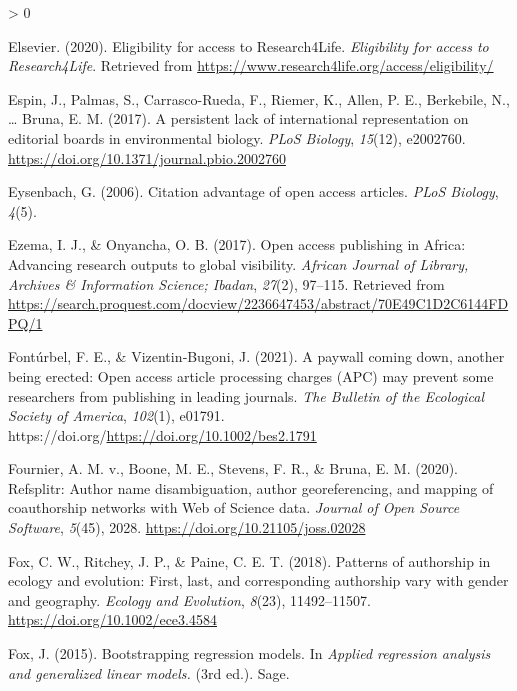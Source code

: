 \documentclass[
  english,
  man]{apa6}
\newlength{\cslhangindent}
\newenvironment{CSLReferences}[2] %
 {%
  \setlength{\parindent}{0pt}
  \ifodd #1 \everypar{\setlength{\hangindent}{\cslhangindent}}\ignorespaces\fi
  \ifnum #2 > 0
  \setlength{\parskip}{#2\baselineskip}
  \fi
 }%
 {}
\begin{document}
\begin{CSLReferences}{1}{0}
\leavevmode\hypertarget{ref-elsevier_eligibility_2020}{}%
Elsevier. (2020). Eligibility for access to {Research4Life}. \emph{Eligibility for access to Research4Life}. Retrieved from \url{https://www.research4life.org/access/eligibility/}

\leavevmode\hypertarget{ref-espin_persistent_2017}{}%
Espin, J., Palmas, S., Carrasco-Rueda, F., Riemer, K., Allen, P. E., Berkebile, N., \ldots{} Bruna, E. M. (2017). A persistent lack of international representation on editorial boards in environmental biology. \emph{PLoS Biology}, \emph{15}(12), e2002760. \url{https://doi.org/10.1371/journal.pbio.2002760}

\leavevmode\hypertarget{ref-eysenbach_citation_2006}{}%
Eysenbach, G. (2006). Citation advantage of open access articles. \emph{PLoS Biology}, \emph{4}(5).

\leavevmode\hypertarget{ref-ezema_open_2017}{}%
Ezema, I. J., \& Onyancha, O. B. (2017). Open access publishing in {Africa}: Advancing research outputs to global visibility. \emph{African Journal of Library, Archives \& Information Science; Ibadan}, \emph{27}(2), 97--115. Retrieved from \url{https://search.proquest.com/docview/2236647453/abstract/70E49C1D2C6144FDPQ/1}

\leavevmode\hypertarget{ref-fonturbel_paywall_2021}{}%
Fontúrbel, F. E., \& Vizentin‐Bugoni, J. (2021). A paywall coming down, another being erected: Open access article processing charges ({APC}) may prevent some researchers from publishing in leading journals. \emph{The Bulletin of the Ecological Society of America}, \emph{102}(1), e01791. https://doi.org/\url{https://doi.org/10.1002/bes2.1791}

\leavevmode\hypertarget{ref-fournier_refsplitr_2020}{}%
Fournier, A. M. v., Boone, M. E., Stevens, F. R., \& Bruna, E. M. (2020). Refsplitr: {Author} name disambiguation, author georeferencing, and mapping of coauthorship networks with {Web} of {Science} data. \emph{Journal of Open Source Software}, \emph{5}(45), 2028. \url{https://doi.org/10.21105/joss.02028}

\leavevmode\hypertarget{ref-fox_patterns_2018}{}%
Fox, C. W., Ritchey, J. P., \& Paine, C. E. T. (2018). Patterns of authorship in ecology and evolution: {First}, last, and corresponding authorship vary with gender and geography. \emph{Ecology and Evolution}, \emph{8}(23), 11492--11507. \url{https://doi.org/10.1002/ece3.4584}

\leavevmode\hypertarget{ref-fox_bootstrapping_2015}{}%
Fox, J. (2015). Bootstrapping regression models. In \emph{Applied regression analysis and generalized linear models.} (3rd ed.). Sage.


\end{CSLReferences}
\end{document}
